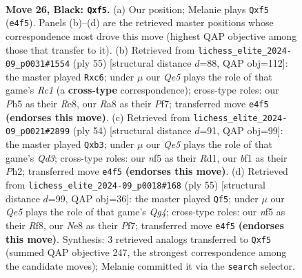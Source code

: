 \documentclass[11pt]{article}
\begin{document}
\clearpage

\begin{figure}[p]\centering
\begin{subfigure}{0.46\textwidth}\centering
\resizebox{\linewidth}{!}{%
\newchessgame
\chessboard[
  setfen={r2rn1k1/p1p2p2/6p1/2Pp1N1p/4qP2/1P2P1P1/3BR2P/Q2K1BR1 b - - 0 26},
  showmover=false,
  pgfstyle=straightmove, color=movearrow, markmove={e4-f5}
]}
\caption{}
\end{subfigure}\hfill
\begin{subfigure}{0.46\textwidth}\centering
\resizebox{\linewidth}{!}{%
\newchessgame
\chessboard[
  setfen={2r1r1k1/1p1n1p2/p1Np2p1/4p1Bq/4P2P/1P3P2/1PPQ4/1K1R3R b - - 0 28},
  showmover=false,
  pgfstyle=straightmove, color=movearrow, markmove={c8-c6}
]}
\caption{}
\end{subfigure}
\\[4pt]
\begin{subfigure}{0.46\textwidth}\centering
\resizebox{\linewidth}{!}{%
\newchessgame
\chessboard[
  setfen={3rrbk1/5pp1/p6p/2p5/P1Np1Nq1/1p1Q2P1/1P3P1P/R2R2K1 w - - 5 28},
  showmover=false,
  pgfstyle=straightmove, color=movearrow, markmove={d3-b3}
]}
\caption{}
\end{subfigure}\hfill
\begin{subfigure}{0.46\textwidth}\centering
\resizebox{\linewidth}{!}{%
\newchessgame
\chessboard[
  setfen={1r3rk1/1p3p2/2p1n1p1/P5q1/1QP5/6Pp/PR3P1P/1R3BK1 b - - 0 28},
  showmover=false,
  pgfstyle=straightmove, color=movearrow, markmove={g5-f5}
]}
\caption{}
\end{subfigure}
\caption{\textbf{Move 26, Black: \texttt{Qxf5}.} (a) Our position; Melanie plays \texttt{Qxf5} (\texttt{e4f5}). Panels (b)--(d) are the retrieved master positions whose correspondence most drove this move (highest QAP objective among those that transfer to it). (b) Retrieved from \texttt{lichess\_elite\_2024-09\_p0031\#1554} (ply 55) [structural distance $d$=88, QAP obj=112]: the master played \texttt{Rxc6}; under $\mu$ our \emph{Qe5} plays the role of that game's \emph{Rc1} (a \textbf{cross-type} correspondence); cross-type roles: our \emph{P}h5 as their \emph{R}e8, our \emph{R}a8 as their \emph{P}f7; transferred move \texttt{e4f5} \textbf{(endorses this move)}. (c) Retrieved from \texttt{lichess\_elite\_2024-09\_p0021\#2899} (ply 54) [structural distance $d$=91, QAP obj=99]: the master played \texttt{Qxb3}; under $\mu$ our \emph{Qe5} plays the role of that game's \emph{Qd3}; cross-type roles: our \emph{n}f5 as their \emph{R}d1, our \emph{b}f1 as their \emph{P}h2; transferred move \texttt{e4f5} \textbf{(endorses this move)}. (d) Retrieved from \texttt{lichess\_elite\_2024-09\_p0018\#168} (ply 55) [structural distance $d$=99, QAP obj=36]: the master played \texttt{Qf5}; under $\mu$ our \emph{Qe5} plays the role of that game's \emph{Qg4}; cross-type roles: our \emph{n}f5 as their \emph{R}f8, our \emph{N}e8 as their \emph{P}f7; transferred move \texttt{e4f5} \textbf{(endorses this move)}. Synthesis: 3 retrieved analogs transferred to \texttt{Qxf5} (summed QAP objective 247, the strongest correspondence among the candidate moves); Melanie committed it via the \texttt{search} selector.}
\label{fig:thought-m51}
\end{figure}
\end{document}
